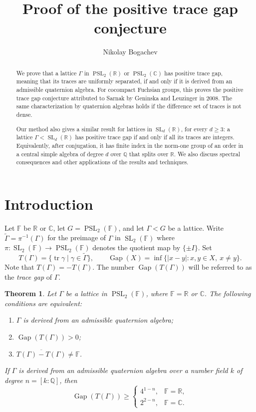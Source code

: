 \documentclass[reqno]{amsart}
\title[Positive trace gap conjecture]{Proof of the positive trace gap conjecture}
\author{Nikolay Bogachev}
\newtheorem{theorem}{Theorem}[section]
\theoremstyle{remark}
\DeclareMathOperator{\tr}{tr}
\DeclareMathOperator{\Gap}{Gap}
\DeclareMathOperator{\SL}{SL}
\DeclareMathOperator{\PSL}{PSL}
\newcommand{\R}{\mathbb R}
\newcommand{\C}{\mathbb C}
\newcommand{\Q}{\mathbb Q}
\newcommand{\F}{\mathbb F}
\newcommand{\G}{\widetilde\Gamma}
\begin{document}
\raggedbottom
\begin{abstract}
We prove that a lattice $\Gamma$ in $\PSL_2(\R)$ or $\PSL_2(\C)$ has positive trace gap, meaning that its traces are uniformly separated, if and only if it is derived from an admissible quaternion algebra. For cocompact Fuchsian groups, this proves the positive trace gap conjecture attributed to Sarnak by Geninska and Leuzinger in 2008. The same characterization by quaternion algebras holds if the difference set of traces is not dense.

Our method also gives a similar result for lattices in $\SL_d(\R)$, for every $d\ge3$: a lattice $\Gamma<\SL_d(\R)$ has positive trace gap if and only if all its traces are integers. Equivalently, after conjugation, it has finite index in the norm-one group of an order in a central simple algebra of degree $d$ over $\Q$ that splits over $\R$. We also discuss spectral consequences and other applications of the results and techniques.
\end{abstract}
\maketitle

\section{Introduction}

Let $\F$ be $\R$ or $\C$, let $G=\PSL_2(\F)$, and let $\Gamma<G$ be a lattice. Write $\G=\pi^{-1}(\Gamma)$ for the preimage of $\Gamma$ in $\SL_2(\F)$ where $\pi:\SL_2(\F)\to\PSL_2(\F)$ denotes the quotient map by $\{\pm I\}$. Set
$$
T(\Gamma)=\{\tr \gamma \mid \gamma\in\G\},
\qquad
\Gap(X)=\inf \{|x-y| : x,y\in X,\ x\ne y\}.
$$
Note that $T(\Gamma)=-T(\Gamma)$. The number $\Gap(T(\Gamma))$ will be referred to as the {\em trace gap} of $\Gamma$.

\begin{theorem}\label{thm:main}
Let $\Gamma$ be a lattice in $\PSL_2(\F)$, where $\F=\R$ or $\C$. The following conditions are equivalent:
\begin{enumerate}
\item $\Gamma$ is derived from an admissible quaternion algebra;
\item $\Gap(T(\Gamma))>0$;
\item $\overline{T(\Gamma)-T(\Gamma)}\ne\F$.
\end{enumerate}
If $\Gamma$ is derived from an admissible quaternion algebra over a number field $k$ of degree $n=[k:\Q]$, then
$$
\Gap(T(\Gamma))\ge
\begin{cases}
4^{1-n},&\F=\R,\\
2^{2-n},&\F=\C.
\end{cases}
$$
\end{theorem}
\end{document}
